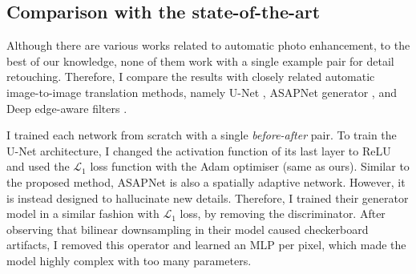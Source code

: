 \subsection{Comparison with the state-of-the-art}
\label{sec:Comparisons}


Although there are various works related to automatic photo enhancement, to the best of our knowledge, none of them work with a single example pair for detail retouching. Therefore, I compare the results with closely related automatic image-to-image translation methods, namely U-Net \cite{ronneberger2015u}, ASAPNet generator \cite{shaham2021spatially}, and Deep edge-aware filters \cite{xu2015deep}.

I trained each network from scratch with a single \textit{before-after} pair. To train the U-Net architecture, I changed the activation function of its last layer to \gls{ReLU} and used the  $\mathcal{L}_{1}$ loss function with the Adam optimiser (same as ours). Similar to the proposed method, ASAPNet is also a spatially adaptive network. However, it is instead designed to hallucinate new details. Therefore, I trained their generator model in a similar fashion with  $\mathcal{L}_{1}$ loss, by removing the discriminator. After observing that bilinear downsampling in their model caused checkerboard artifacts, I removed this operator and learned an MLP per pixel, which made the model highly complex with too many parameters.



